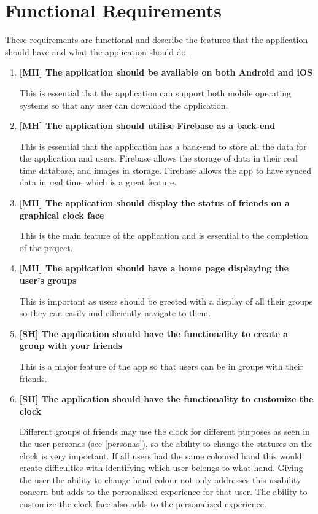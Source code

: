 \section{Functional Requirements} \label{functional}
These requirements are functional and describe the features that the application should have and what the application should do. 
\begin{enumerate}
    \item \textbf{[MH] The application should be available on both Android and iOS} \par
    This is essential that the application can support both mobile operating systems so that any user can download the application.
    \item \textbf{[MH] The application should utilise Firebase as a back-end} \par
    This is essential that the application has a back-end to store all the data for the application and users. Firebase allows the storage of data in their real time database, and images in storage. Firebase allows the app to have synced data in real time which is a great feature.
    \item \textbf{[MH] The application should display the status of friends on a graphical clock face} \par
    This is the main feature of the application and is essential to the completion of the project.
    \item \textbf{[MH] The application should have a home page displaying the user's groups} \par
    This is important as users should be greeted with a display of all their groups so they can easily and efficiently navigate to them.
    \item \textbf{[SH] The application should have the functionality to create a group with your friends} \par
    This is a major feature of the app so that users can be in groups with their friends.
    \item \textbf{[SH] The application should have the functionality to customize the clock} \par
    Different groups of friends may use the clock for different purposes as seen in the user personas (see \ref{personas}), so the ability to change the statuses on the clock is very important. If all users had the same coloured hand this would create difficulties with identifying which user belongs to what hand. Giving the user the ability to change hand colour not only addresses this usability concern but adds to the personalised experience for that user. The ability to customize the clock face also adds to the personalized experience.

\end{enumerate}
